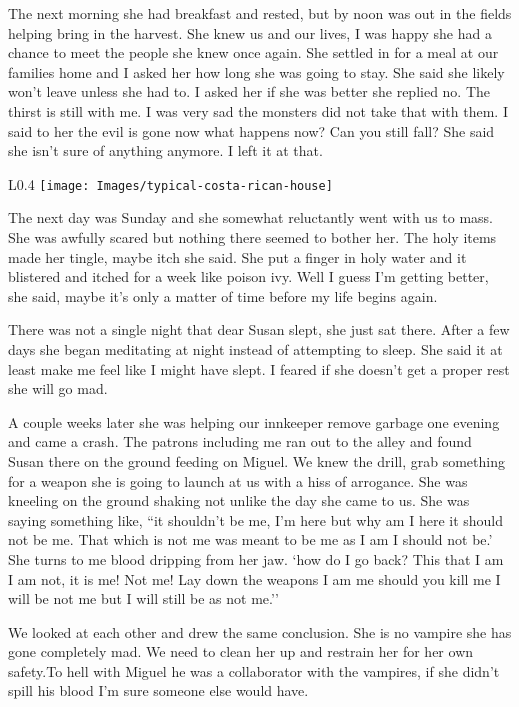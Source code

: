The next morning she had breakfast and rested, but by noon was out in the fields helping bring in the harvest. She knew us and our lives, I was happy she had a chance to meet the people she knew once again. She settled in for a meal at our families home and I asked her how long she was going to stay. She said she likely won't leave unless she had to. I asked her if she was better she replied no. The thirst is still with me. I was very sad the monsters did not take that with them. I said to her the evil is gone now what happens now? Can you still fall? She said she isn't sure of anything anymore. I left it at that.
\begin{wrapfigure}{L}{0.4\textwidth}
	\centering
	\texttt{[image: Images/typical-costa-rican-house]}
\end{wrapfigure}
The next day was Sunday and she somewhat reluctantly went with us to mass. She was awfully scared but nothing there seemed to bother her. The holy items made her tingle, maybe itch she said. She put a finger in holy water and it blistered and itched for a week like poison ivy. Well I guess I'm getting better, she said, maybe it's only a matter of time before my life begins again.

There was not a single night that dear Susan slept, she just sat there. After a few days she began meditating at night instead of attempting to sleep. She said it at least make me feel like I might have slept. I feared if she doesn't get a proper rest she will go mad.

A couple weeks later she was helping our innkeeper remove garbage one evening and came a crash. The patrons including me ran out to the alley and found Susan there on the ground feeding on Miguel. We knew the drill, grab something for a weapon she is going to launch at us with a hiss of arrogance. She was kneeling on the ground shaking not unlike the day she came to us. She was saying something like, ``it shouldn't be me, I'm here but why am I here it should not be me. That which is not me was meant to be me as I am I should not be.' She turns to me blood dripping from her jaw. `how do I go back? This that I am I am not, it is me! Not me! Lay down the weapons I am me should you kill me I will be not me but I will still be as not me.''

We looked at each other and drew the same conclusion. She is no vampire she has gone completely mad. We need to clean her up and restrain her for her own safety.To hell with Miguel he was a collaborator with the vampires, if she didn't spill his blood I'm sure someone else would have.


